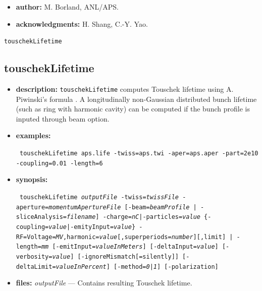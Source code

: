 \documentclass[11pt]{article}
\begin{document}
\begin{itemize}
\item {\bf author:} M. Borland, ANL/APS.

\item {\bf acknowledgments:} H. Shang, C.-Y. Yao.

\end{itemize}


\newpage
\begin{center}{\Large\verb|touschekLifetime|}\end{center}
\subsection{touschekLifetime}

\begin{itemize}

\item {\bf description:} \verb|touschekLifetime| computes Touschek
  lifetime using A. Piwinski's formula \cite{Piwinski, Xiao2007a}. A
  longitudinally non-Gaussian distributed bunch lifetime (such as ring
  with harmonic cavity) can be computed if the bunch profile is
  inputed through beam option.

\item {\bf examples:}
\begin{flushleft}{\tt
touschekLifetime aps.life -twiss=aps.twi -aper=aps.aper -part=2e10 -coupling=0.01 -length=6
}\end{flushleft}

\item {\bf synopsis:}
\begin{flushleft}{\tt 
touschekLifetime {\em outputFile}
 -twiss={\em twissFile} -aperture={\em momentumApertureFile} [-beam={\em beamProfile} | -sliceAnalysis={\em filename}] 
 {-charge={\em nC}|-particles={\em value}} \{-coupling={\em value}|-emityInput={\em value}\}
 {-RF=Voltage={\em MV},harmonic={\em value}[,superperiods={\em number}][,limit] | -length={\em mm}} 
 [-emitInput={\em valueInMeters}] [-deltaInput={\em value}] [-verbosity={\em value}]
 [-ignoreMismatch[=silently]] [-deltaLimit={\em valueInPercent}] [-method={\em 0|1}] 
 [-polarization]
}\end{flushleft}

\item {\bf files:}
{\em outputFile} --- Contains resulting Touschek lifetime.


\end{itemize}
\end{document}
